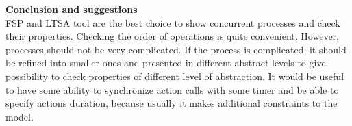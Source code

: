 \documentclass{article}
\begin{document}
\begin{enumerate}
\begin{enumerate}
\end{enumerate}
\textbf{Conclusion and suggestions}\\
 FSP and LTSA tool are the best choice to show concurrent processes and check their properties. Checking the order of operations is quite convenient. However, processes should not be very complicated. If the process is complicated, it should be refined into smaller ones and presented in different abstract levels to give possibility to check properties of different level of abstraction.
 It would be useful to have some ability to synchronize action calls with some timer and be able to specify actions duration, because usually it makes additional constraints to the model.

\end{enumerate}
\end{document}
